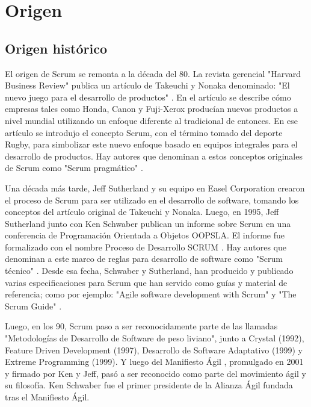 \chapter{Origen}

\section{Origen histórico}

El origen de Scrum se remonta a la década del 80. La revista gerencial "Harvard Business Review" publica un artículo de Takeuchi y Nonaka denominado: "El nuevo juego para el desarrollo de productos" \cite{Takeuchi-Nonaka-1986}. En el artículo se describe cómo empresas tales como Honda, Canon y Fuji-Xerox producían nuevos productos a nivel mundial utilizando un enfoque diferente al tradicional de entonces. En ese artículo se introdujo el concepto Scrum, con el término tomado del deporte Rugby, para simbolizar este nuevo enfoque basado en equipos integrales para el desarrollo de productos. Hay autores que denominan a estos conceptos originales de Scrum como "Scrum pragmático" \cite{ScrumManager-2014}.

Una década más tarde, Jeff Sutherland y su equipo en Easel Corporation crearon el proceso de Scrum para ser utilizado en el 
desarrollo de software, tomando los conceptos del artículo original de Takeuchi y Nonaka. Luego, en 1995, Jeff Sutherland junto con Ken Schwaber publican un informe sobre Scrum en una conferencia de Programación Orientada a Objetos OOPSLA. El informe fue formalizado con el nombre Proceso de Desarrollo SCRUM \cite{Ken-Schwaber-1995}. Hay autores que denominan a este marco de reglas para desarrollo de software como "Scrum técnico" \cite{ScrumManager-2014}. Desde esa fecha, Schwaber y Sutherland, han producido y publicado varias especificaciones para Scrum que han servido como guías y material de referencia; como por ejemplo: "Agile software development with Scrum" \cite{Ken-Schwaber-2002} y "The Scrum Guide" \cite{Ken-Jeff-2013}.

Luego, en los 90, Scrum paso a ser reconocidamente parte de las llamadas "Metodologías de Desarrollo de Software de peso liviano", junto a Crystal (1992), Feature Driven Development (1997), Desarrollo de Software Adaptativo (1999) y Extreme Programming (1999). Y luego del Manifiesto Ágil \cite{Beck-2001}, promulgado en 2001 y firmado por Ken y Jeff, pasó a ser reconocido como parte del movimiento ágil y su filosofía. Ken Schwaber fue el primer presidente de la Alianza Ágil fundada tras el Manifiesto Ágil.

